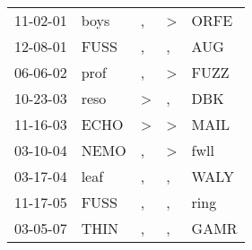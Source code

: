 \begin{supertabular}{lllll}
 11-02-01 &  boys &             , &  \textgreater &  ORFE \\
 12-08-01 &  FUSS &             , &             , &   AUG \\
 06-06-02 &  prof &             , &  \textgreater &  FUZZ \\
 10-23-03 &  reso &  \textgreater &             , &   DBK \\
 11-16-03 &  ECHO &  \textgreater &  \textgreater &  MAIL \\
 03-10-04 &  NEMO &             , &  \textgreater &  fwll \\
 03-17-04 &  leaf &             , &             , &  WALY \\
 11-17-05 &  FUSS &             , &             , &  ring \\
 03-05-07 &  THIN &             , &             , &  GAMR \\
\end{supertabular}
